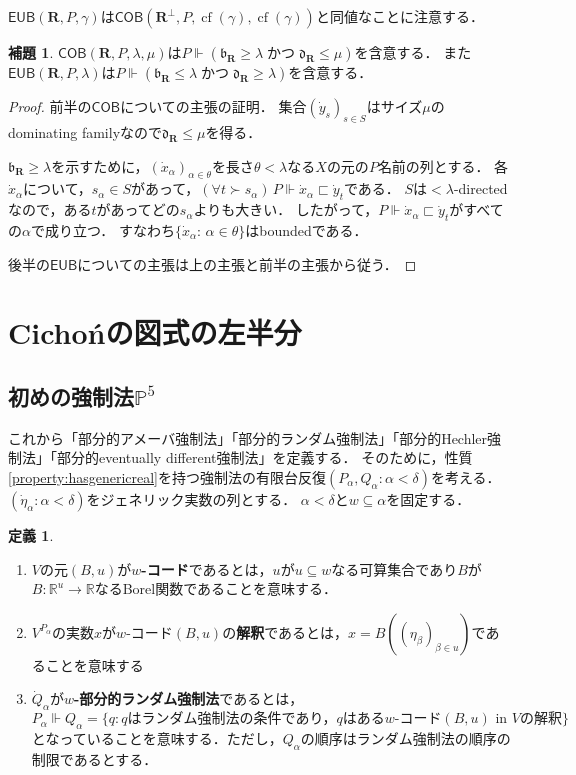 \documentclass[uplatex,dvipdfmx]{jsarticle}
\newcommand{\R}{\mathbb{R}}
\newcommand\forces{\Vdash}
\newcommand{\AND}{\mathbin{\text{かつ}}}
\newcommand{\frakb}{\mathfrak{b}}
\newcommand{\frakd}{\mathfrak{d}}
\newcommand{\cf}{\operatorname{cf}}
\newcommand{\EUB}{\mathsf{EUB}}
\newcommand{\COB}{\mathsf{COB}}
\newcommand{\relR}{\mathbf{R}}
\newcommand{\Pa}{\mathbb{P}^5}
\renewcommand\subset{\subseteq}
\theoremstyle{definition}
\newtheorem{defi}[thm]{定義}
\newtheorem{lem}[thm]{補題}
\begin{document}
	$\EUB(\relR, P, \gamma)$は$\COB(\relR^\perp, P, \cf(\gamma), \cf(\gamma))$と同値なことに注意する．
	
	\begin{lem}\label{lem:cobimpliesineq}
		$\COB(\relR, P, \lambda, \mu)$は$P \forces (\frakb_\relR \ge \lambda \AND \frakd_\relR \le \mu)$を含意する．
		また$\EUB(\relR, P, \lambda)$は$P \forces (\frakb_\relR \le \lambda \AND \frakd_\relR \ge \lambda)$を含意する．
	\end{lem}
	\begin{proof}
		前半の$\COB$についての主張の証明．
		集合$(\dot{y}_s)_{s\in S}$はサイズ$\mu$のdominating familyなので$\mathfrak{d}_\relR\le \mu$を得る．

		$\mathfrak{b}_\relR \ge \lambda$を示すために，$(\dot{x}_\alpha)_{\alpha\in\theta}$を長さ$\theta<\lambda$なる$X$の元の$P$名前の列とする．
		各$\dot{x}_\alpha$について，$s_\alpha\in S$があって，$(\forall t\succ s_\alpha)\, P\forces \dot{x}_\alpha \sqsubset \dot{y}_t$である．
		$S$は${<}\lambda$-directedなので，ある$t$があってどの$s_\alpha$よりも大きい．
		したがって，$P\forces \dot{x}_\alpha \sqsubset \dot{y}_t $がすべての$\alpha$で成り立つ．
		すなわち$\{\dot{x}_\alpha:\, \alpha\in\theta\}$はboundedである．
		
		後半の$\EUB$についての主張は上の主張と前半の主張から従う．
	\end{proof}

	\section{Cichońの図式の左半分}\label{sec:leftside}
	
	\subsection{初めの強制法$\Pa$}

	これから「部分的アメーバ強制法」「部分的ランダム強制法」「部分的Hechler強制法」「部分的eventually different強制法」を定義する．
	そのために，性質\ref{property:hasgenericreal}を持つ強制法の有限台反復$(P_\alpha, Q_\alpha : \alpha < \delta)$を考える．
	$(\dot{\eta}_\alpha : \alpha < \delta)$をジェネリック実数の列とする．
	$\alpha < \delta$と$w \subset \alpha$を固定する．

	\begin{defi}
		\begin{enumerate}
		\item $V$の元$(B, u)$が\textbf{$w$-コード}であるとは，$u$が$u \subset w$なる可算集合であり$B$が$B \colon \R^u \to \R$なるBorel関数であることを意味する．
		\item $V^{P_\alpha}$の実数$x$が$w$-コード$(B, u)$の\textbf{解釈}であるとは，$x = B((\eta_\beta)_{\beta \in u})$であることを意味する
		\item $\dot{Q}_\alpha$が\textbf{$w$-部分的ランダム強制法}であるとは，
		\[
			P_\alpha \forces Q_\alpha = \{ q : q \text{はランダム強制法の条件であり，}q\text{はある}w\text{-コード}(B, u)\text{ in }V\text{の解釈}\}	
		\]
		となっていることを意味する．ただし，$Q_\alpha$の順序はランダム強制法の順序の制限であるとする．
		\end{enumerate}
	\end{defi}
\end{document}
